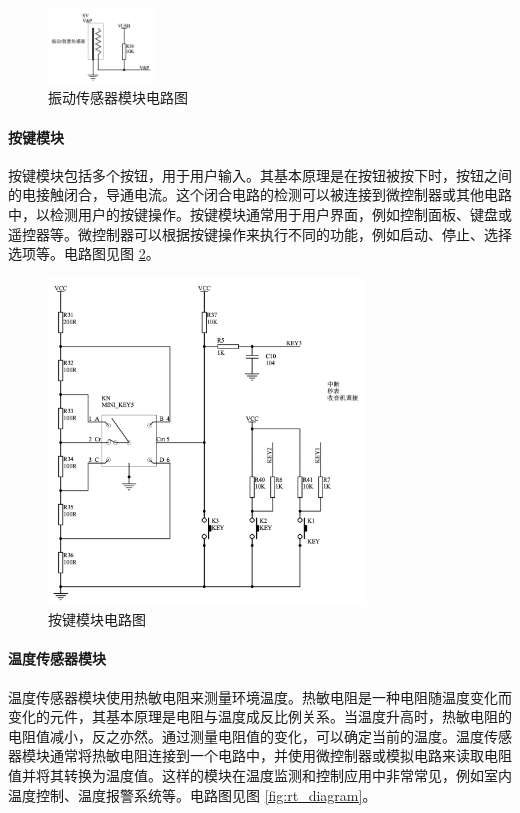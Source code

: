 \documentclass{article}
\begin{document}
\begin{figure}[h]
    \centering
    \includegraphics[width=0.25\textwidth]{vib_diagram}
    \caption{振动传感器模块电路图}
    \label{fig:vib_diagram}
\end{figure}

\paragraph{按键模块}
按键模块包括多个按钮，用于用户输入。其基本原理是在按钮被按下时，按钮之间的电接触闭合，导通电流。这个闭合电路的检测可以被连接到微控制器或其他电路中，以检测用户的按键操作。按键模块通常用于用户界面，例如控制面板、键盘或遥控器等。微控制器可以根据按键操作来执行不同的功能，例如启动、停止、选择选项等。电路图见图 \ref{fig:keys_diagram}。

\begin{figure}[h]
    \centering
    \includegraphics[width=0.75\textwidth]{keys_diagram}
    \caption{按键模块电路图}
    \label{fig:keys_diagram}
\end{figure}

\paragraph{温度传感器模块}
温度传感器模块使用热敏电阻来测量环境温度。热敏电阻是一种电阻随温度变化而变化的元件，其基本原理是电阻与温度成反比例关系。当温度升高时，热敏电阻的电阻值减小，反之亦然。通过测量电阻值的变化，可以确定当前的温度。温度传感器模块通常将热敏电阻连接到一个电路中，并使用微控制器或模拟电路来读取电阻值并将其转换为温度值。这样的模块在温度监测和控制应用中非常常见，例如室内温度控制、温度报警系统等。电路图见图 \ref{fig:rt_diagram}。
\end{document}
